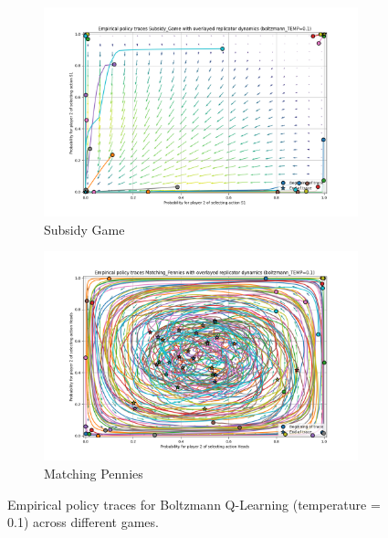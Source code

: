 \documentclass[12pt,a4paper, onecolumn]{exam}
\begin{document}
\begin{appendices}
\begin{figure}[H]
        \vspace{0.5cm}
        \begin{subfigure}{0.44\textwidth}
            \centering
            \includegraphics[width=\linewidth]{plots/replicator_trajectoreis_Subsidy_Game_boltzmann_TEMP=0.1.png}
            \caption{Subsidy Game}
        \end{subfigure}
        \hfill
        \begin{subfigure}{0.44\textwidth}
            \centering
            \includegraphics[width=\linewidth]{plots/replicator_trajectoreis_Matching_Pennies_boltzmann_TEMP=0.1.png}
            \caption{Matching Pennies}
        \end{subfigure}
        \caption{Empirical policy traces for Boltzmann Q-Learning (temperature = 0.1) across different games.}
        \label{fig:app_boltzmann_combined}
    \end{figure}


\end{appendices}
\end{document}
